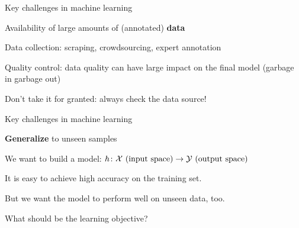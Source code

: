 \documentclass[usenames,dvipsnames,notes,11pt,aspectratio=169]{beamer}
\begin{document}
\begin{frame}
    {Key challenges in machine learning}
    \begin{wideitemize}
        \item Availability of large amounts of (annotated) {\bf data}
            \begin{wideitemize}
                \item Data collection: scraping, crowdsourcing, expert annotation
                \item Quality control: data quality can have large impact on the final model (garbage in garbage out)
                \item Don't take it for granted: always check the data source!
            \end{wideitemize}
    \end{wideitemize}
    \medskip\pause
\end{frame}

\begin{frame}
    {Key challenges in machine learning}
    \begin{wideitemize}
        \item \textbf{Generalize} to unseen samples
            \begin{wideitemize}
                \item We want to build a model: $h\colon \mathcal{X} \text{ (input space)} \rightarrow \mathcal{Y} \text{ (output space)}$
                \item It is easy to achieve high accuracy on the training set.
                \item But we want the model to perform well on unseen data, too.
                \item What should be the learning objective? 
            \end{wideitemize}
    \end{wideitemize}
\end{frame}
\end{document}

